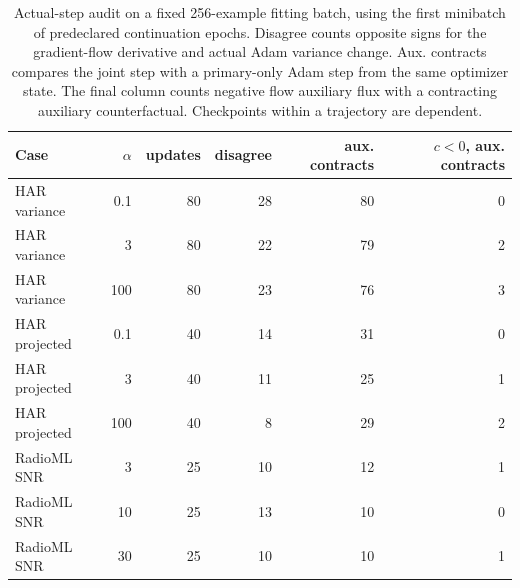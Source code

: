 \begin{table}[t]
\centering
\caption{Actual-step audit on a fixed 256-example fitting batch, using the first minibatch of predeclared continuation epochs. Disagree counts opposite signs for the gradient-flow derivative and actual Adam variance change. Aux. contracts compares the joint step with a primary-only Adam step from the same optimizer state. The final column counts negative flow auxiliary flux with a contracting auxiliary counterfactual. Checkpoints within a trajectory are dependent.}
\label{tab:cpu_adam}
\footnotesize
\begin{tabular}{lrrrrr}
\toprule
Case & $\alpha$ & updates & disagree & aux. contracts & $c<0$, aux. contracts \\
\midrule
HAR variance & 0.1 & 80 & 28 & 80 & 0 \\
HAR variance & 3 & 80 & 22 & 79 & 2 \\
HAR variance & 100 & 80 & 23 & 76 & 3 \\
HAR projected & 0.1 & 40 & 14 & 31 & 0 \\
HAR projected & 3 & 40 & 11 & 25 & 1 \\
HAR projected & 100 & 40 & 8 & 29 & 2 \\
RadioML SNR & 3 & 25 & 10 & 12 & 1 \\
RadioML SNR & 10 & 25 & 13 & 10 & 0 \\
RadioML SNR & 30 & 25 & 10 & 10 & 1 \\
\bottomrule
\end{tabular}
\end{table}
